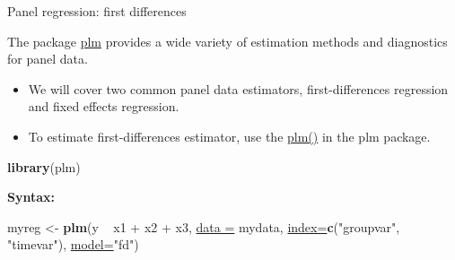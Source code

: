 \documentclass[ignorenonframetext,]{beamer}
\newenvironment{Shaded}{\begin{snugshade}}{\end{snugshade}}
\newcommand{\KeywordTok}[1]{\textcolor[rgb]{0.26,0.66,0.93}{\textbf{#1}}}
\newcommand{\DataTypeTok}[1]{\textcolor[rgb]{0.74,0.68,0.62}{\underline{#1}}}
\newcommand{\StringTok}[1]{\textcolor[rgb]{0.02,0.61,0.04}{#1}}
\newcommand{\OperatorTok}[1]{\textcolor[rgb]{0.74,0.68,0.62}{#1}}
\newcommand{\NormalTok}[1]{\textcolor[rgb]{0.74,0.68,0.62}{#1}}
\begin{document}
\begin{frame}[fragile]{Panel regression: first differences}

The package \href{https://www.rdocumentation.org/packages/plm}{plm}
provides a wide variety of estimation methods and diagnostics for panel
data.

\begin{itemize}
\item
  We will cover two common panel data estimators, first-differences
  regression and fixed effects regression.
\item
  To estimate first-differences estimator, use the
  \href{https://www.rdocumentation.org/packages/plm/versions/1.6-5/topics/plm}{plm()}
  in the plm package.
\end{itemize}

\begin{Shaded}
\begin{Highlighting}[]
\KeywordTok{library}\NormalTok{(plm)}
\end{Highlighting}
\end{Shaded}

\textbf{Syntax:}

\begin{Shaded}
\begin{Highlighting}[]
\NormalTok{myreg <-}\StringTok{ }\KeywordTok{plm}\NormalTok{(y }\OperatorTok{~}\StringTok{ }\NormalTok{x1 }\OperatorTok{+}\StringTok{ }\NormalTok{x2 }\OperatorTok{+}\StringTok{ }\NormalTok{x3, }\DataTypeTok{data =}\NormalTok{ mydata, }
          \DataTypeTok{index=}\KeywordTok{c}\NormalTok{(}\StringTok{"groupvar"}\NormalTok{, }\StringTok{"timevar"}\NormalTok{), }\DataTypeTok{model=}\StringTok{"fd"}\NormalTok{)}
\end{Highlighting}
\end{Shaded}

\end{frame}
\end{document}
